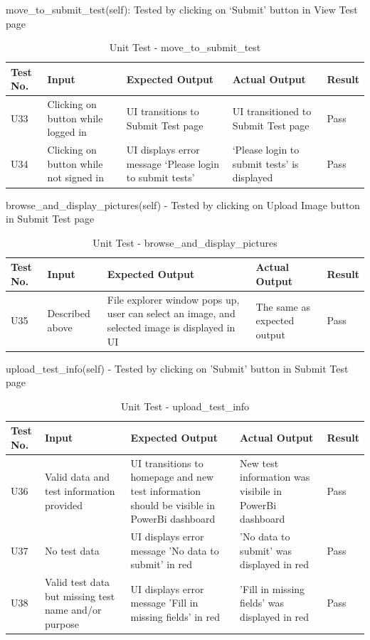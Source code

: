 \documentclass[12pt, titlepage]{article}
\begin{document}
move\_to\_submit\_test(self): Tested by clicking on ‘Submit’ button in View Test page
\begin{table}[H]
  \begin{tabular}{| p{} | p{}| p{}| p{}| p{}|}
    \hline
    \rowcolor[gray]{0.9}
    Test No. & Input & Expected Output & Actual Output & Result\\
    \hline
    U33 & Clicking on button while logged in & UI transitions to Submit Test page & UI transitioned to Submit Test page & Pass \\
    \hline
    U34 & Clicking on button while not signed in & UI displays error message ‘Please login to submit tests’ & ‘Please login to submit tests’ is displayed & Pass \\
    \hline
  \end{tabular}
  \caption{Unit Test - move\_to\_submit\_test}
\end{table}


browse\_and\_display\_pictures(self) - Tested by clicking on Upload Image button in Submit Test page  
\begin{table}[H]
  \begin{tabular}{| p{} | p{}| p{}| p{}| p{}|}
    \hline
    \rowcolor[gray]{0.9}
    Test No. & Input & Expected Output & Actual Output & Result\\
    \hline
    U35 & Described above & File explorer window pops up, user can select an image, and selected image is displayed in UI & The same as expected output & Pass \\
    \hline
  \end{tabular}
  \caption{Unit Test - browse\_and\_display\_pictures}
\end{table}

upload\_test\_info(self) - Tested by clicking on 'Submit' button in Submit Test page 
\begin{table}[H]
  \begin{tabular}{| p{} | p{}| p{}| p{}| p{}|}
    \hline
    \rowcolor[gray]{0.9}
    Test No. & Input & Expected Output & Actual Output & Result\\
    \hline
    U36 & Valid data and test information provided & UI transitions to homepage and new test information should be visible in PowerBi dashboard & New test information was visibile in PowerBi dashboard & Pass \\
    \hline
    U37 & No test data & UI displays error message 'No data to submit' in red & 'No data to submit' was displayed in red & Pass \\
    \hline
    U38 & Valid test data but missing test name and/or purpose & UI displays error message 'Fill in missing fields' in red & 'Fill in missing fields' was displayed in red & Pass \\
    \hline
  \end{tabular}
  \caption{Unit Test - upload\_test\_info}
\end{table}
\end{document}

